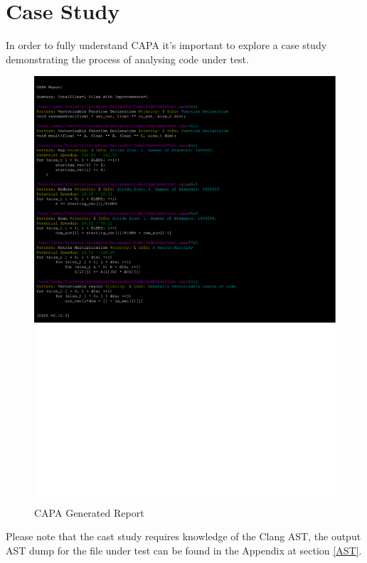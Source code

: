 
\section{Case Study}\label{caseStudy} %
In order to fully understand CAPA it's important to explore a case study demonstrating the process
of analysing code under test.

\begin{figure}[H]
\includegraphics[clip, trim=0cm 12.7cm 6cm 0.5cm, width=\textwidth]{./Misc/report.pdf}
\caption{CAPA Generated Report}
\end{figure}
Please note that the cast study requires knowledge of the Clang AST, the output AST dump for the file
under test can be found in the Appendix at section \ref{AST}.

